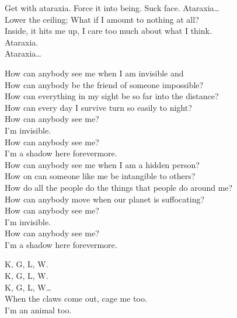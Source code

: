 Get with ataraxia. Force it into being. Suck face. Ataraxia… \\
Lower the ceiling; What if I amount to nothing at all? \\
Inside, it hits me up, I care too much about what I think. \\

Ataraxia. \\
Ataraxia… \\




How can anybody see me when I am invisible and \\
How can anybody be the friend of someone impossible? \\
How can everything in my sight be so far into the distance? \\
How can every day I survive turn so easily to night? \\

How can anybody see me? \\
I'm invisible. \\
How can anybody see me? \\
I'm a shadow here forevermore. \\

How can anybody see me when I am a hidden person? \\
How on  can someone like me be intangible to others? \\
How do all the people do the things that people do around me? \\
How can anybody move when our planet is suffocating? \\

How can anybody see me? \\
I'm invisible. \\
How can anybody see me? \\
I'm a shadow here forevermore. \\




K, G, L, W. \\
K, G, L, W. \\
K, G, L, W… \\

When the claws come out, cage me too. \\
I'm an animal too. \\
